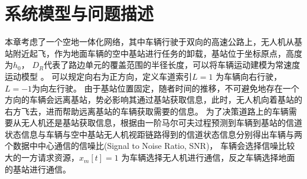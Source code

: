 \section{系统模型与问题描述}\label{section4-2}
本章考虑了一个空地一体化网络，其中车辆行驶于双向的高速公路上，无人机从基站附近起飞，作为地面车辆的空中基站进行任务的卸载，基站位于坐标原点，高度为$h_0$，
$D_R$代表了路边单元的覆盖范围的半径长度，可以将车辆运动建模为常速度运动模型 \supercite{COIFMAN1998271}。 可以规定向右为正方向，定义车道索引$L=1$ 为车辆向右行驶，$L=-1$为向左行驶。  %
由于基站位置固定，随者时间的推移，不可避免地存在一个方向的车辆会远离基站，势必影响其通过基站获取信息，此时，无人机向着基站的右方飞去，进而帮助远离基站的车辆获取需要的信息。
为了决策道路上的车辆需要从无人机还是基站获取信息，根据由一阶马尔可夫过程预测到车辆到基站的信道状态信息与车辆与空中基站无人机视距链路得到的信道状态信息分别得出车辆与两个数据中中心通信的信噪比(Signal to Noise Ratio, SNR)，
车辆会选择信噪比较大的一方请求资源，$x_m\left[t\right]=1$ 为车辆选择无人机进行通信，反之车辆选择地面的基站进行通信。

